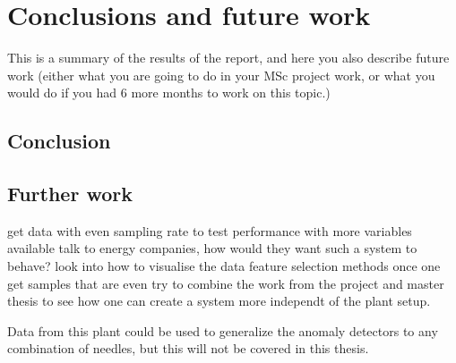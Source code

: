 \chapter{Conclusions and future work}\label{cha:conclusions}
%
This is a summary of the results of the report, and here you also describe future work (either what you are going to do in your MSc project work, or what you would do if you had 6 more months to work on this topic.)












\section{Conclusion}


\section{Further work}
    get data with even sampling rate to test performance with more variables available
    talk to energy companies, how would they want such a system to behave?
    look into how to visualise the data 
    feature selection methods once one get samples that are even 
    try to combine the work from the project and master thesis to see how one can create a system more independt of the plant setup. 
    
    Data from this plant could be used to generalize the anomaly detectors to any combination of needles, but this will not be covered in this thesis. 
    